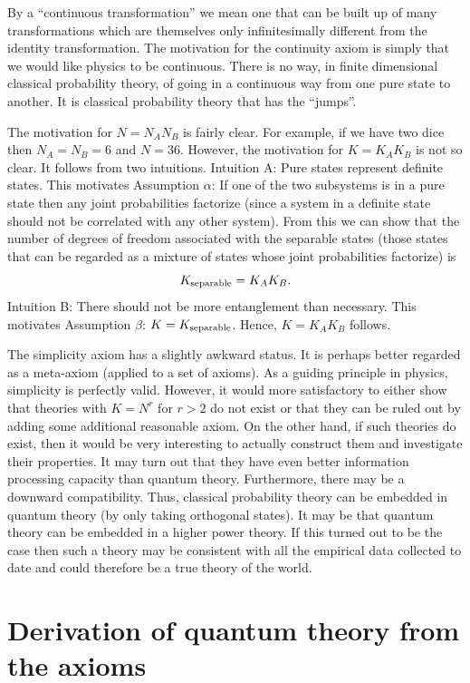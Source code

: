\documentclass[12pt]{article}
\begin{document}
By a ``continuous transformation'' we mean one that can be built up of many
transformations which are themselves only infinitesimally different from
the identity transformation.
The motivation for the continuity axiom is simply that we would like
physics to be continuous.  There is no way, in finite dimensional
classical probability theory, of going in a continuous way from one pure
state to another.  It is classical probability theory that has the
``jumps''.

The motivation for $N=N_AN_B$ is fairly clear.  For example, if we have
two dice then $N_A=N_B=6$ and $N=36$.  However, the motivation for
$K=K_AK_B$ is not so clear.  It follows from two intuitions.
Intuition A: Pure states represent definite states.  This motivates
Assumption $\alpha$: If one of the two subsystems is in a pure
state then any joint
probabilities factorize (since a system in a definite state should not
be correlated with any other system).  From this we can show that the
number of degrees of freedom associated with the separable states (those
states that can be regarded as a mixture of states whose joint probabilities
factorize) is
\begin{equation}
K_{\rm separable} = K_A K_B.
\end{equation}
Intuition B: There should not be more entanglement than necessary.
This motivates Assumption $\beta$: $K=K_{\rm separable}$.
Hence, $K=K_AK_B$ follows.

The simplicity axiom has a slightly awkward status.  It is perhaps
better regarded as a meta-axiom (applied to a set of axioms).  As a
guiding principle in physics, simplicity is perfectly valid. However, it
would more satisfactory to either show that theories with $K=N^r$ for
$r>2$ do not exist or that they can be ruled out by adding some
additional reasonable axiom.  On the other hand, if such theories do
exist, then it would be very interesting to actually construct them and
investigate their properties.  It may turn out that they have even
better information processing capacity than quantum theory.
Furthermore, there may be a downward compatibility. Thus, classical
probability theory can be embedded in quantum theory (by only taking
orthogonal states).  It may be that quantum theory can be embedded in a
higher power theory.  If this turned out to be the case then such a
theory may be consistent with all the empirical data collected to date
and could therefore be a true theory of the world.

\section{Derivation of quantum theory from the axioms}
\end{document}
